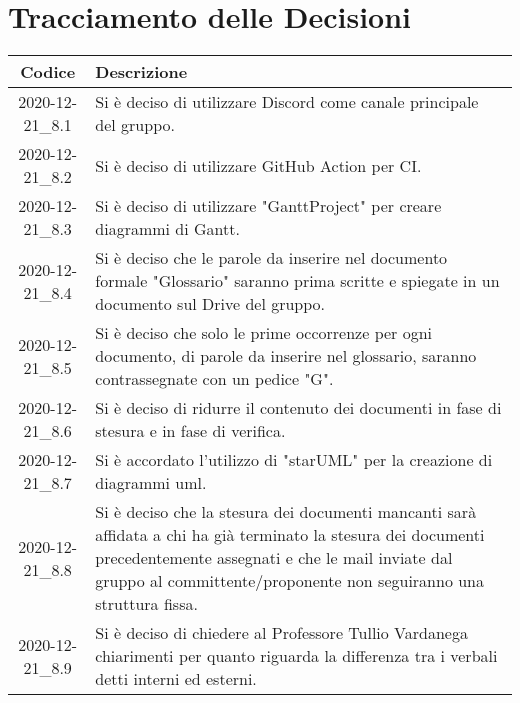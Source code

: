 \section*{Tracciamento delle Decisioni}

\begin{center}
	\begin{longtable}{|c|p{13cm}|}
	\hline
	\rowcolor{lighter-grayer}
	\textbf{Codice} & \textbf{Descrizione} \\
	\hline
	\endfirsthead

	
	2020-12-21\_8.1 & Si è deciso di utilizzare Discord come canale principale del gruppo. \\
	\hline
	2020-12-21\_8.2 & Si è deciso di utilizzare GitHub Action per CI. \\
	\hline
	2020-12-21\_8.3 & Si è deciso di utilizzare "GanttProject" per creare diagrammi di Gantt.  \\
	\hline
	2020-12-21\_8.4 & Si è deciso che le parole da inserire nel documento formale "Glossario" saranno prima scritte e spiegate in un documento sul Drive del gruppo.  \\
	\hline
	2020-12-21\_8.5 & Si è deciso che solo le prime occorrenze per ogni documento, di parole da inserire nel glossario, saranno contrassegnate con un pedice "G". \\
	\hline
	2020-12-21\_8.6 & Si è deciso di ridurre il contenuto dei documenti in fase di stesura e in fase di verifica. \\
	\hline
	2020-12-21\_8.7 & Si è accordato l'utilizzo di "starUML" per la creazione di diagrammi uml.  \\
	\hline
	2020-12-21\_8.8 & Si è deciso che la stesura dei documenti mancanti sarà affidata a chi ha già terminato la stesura dei documenti precedentemente assegnati e che le mail inviate dal gruppo al committente/proponente non seguiranno una struttura fissa.  \\
	\hline
	2020-12-21\_8.9 & Si è deciso di chiedere al Professore Tullio Vardanega chiarimenti per quanto riguarda la differenza tra i verbali detti interni ed esterni.  \\
	

	\end{longtable}
\end{center}
